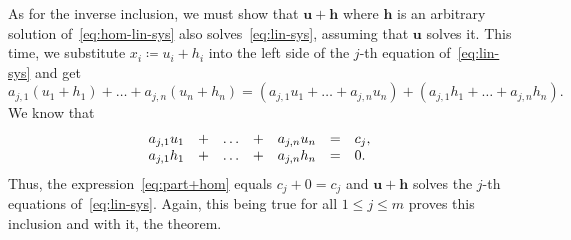 \begin{thmproof}
 As for the inverse inclusion, we must show that $\mathbf{u} + \mathbf{h}$ where
 $\mathbf{h}$ is an arbitrary solution of~\eqref{eq:hom-lin-sys} also
 solves~\eqref{eq:lin-sys}, assuming that $\mathbf{u}$ solves it. This time, we
 substitute $x_i \coloneqq u_i + h_i$ into the left side of the $j$-th equation
 of~\eqref{eq:lin-sys} and get
 \begin{equation}
  \label{eq:part+hom}
  a_{j,1}(u_1 + h_1) + \ldots + a_{j,n}(u_n + h_n) = (a_{j,1}u_1 + \ldots +
  a_{j,n}u_n) + (a_{j,1}h_1 + \ldots + a_{j,n}h_n).
 \end{equation}
 We know that
 \[
  \begin{array}{r c c c r c l}
   a_{j,1}u_1 & + & \ldots & + & a_{j,n}u_n & = & c_j,\\
   a_{j,1}h_1 & + & \ldots & + & a_{j,n}h_n & = & 0.
  \end{array}
 \]
 Thus, the expression~\eqref{eq:part+hom} equals $c_j + 0 = c_j$ and $\mathbf{u}
 + \mathbf{h}$ solves the $j$-th equations of~\eqref{eq:lin-sys}. Again, this
 being true for all $1 \leq j \leq m$ proves this inclusion and with it, the
 theorem.
\end{thmproof}

